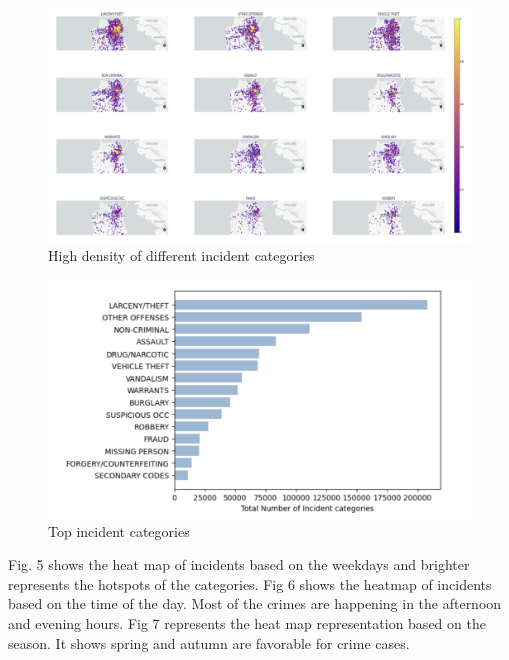 \documentclass[10 pt,conference,final,]{IEEEtran}
\begin{document}
\begin{figure}

{\centering \includegraphics[width=0.9\linewidth]{img/fig3} 

}

\caption{High density of different incident categories}\label{fig:unnamed-chunk-3}
\end{figure}

\begin{figure}

{\centering \includegraphics[width=0.95\linewidth]{img/fig4} 

}

\caption{Top incident categories}\label{fig:unnamed-chunk-4}
\end{figure}

Fig. 5 shows the heat map of incidents based on the weekdays and
brighter represents the hotspots of the categories. Fig 6 shows the
heatmap of incidents based on the time of the day. Most of the crimes
are happening in the afternoon and evening hours. Fig 7 represents the
heat map representation based on the season. It shows spring and autumn
are favorable for crime cases.
\end{document}
